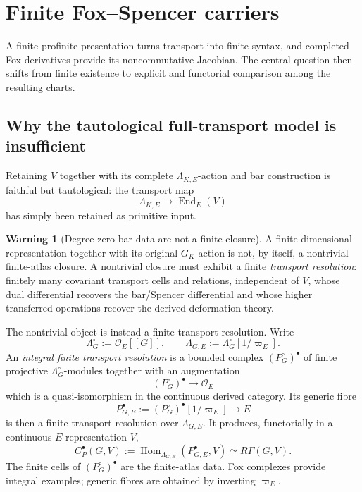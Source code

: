 \documentclass[11pt]{article}
\theoremstyle{definition}
\newtheorem{warning}[theorem]{Warning}
\newcommand{\End}{\operatorname{End}}
\begin{document}
\section{Finite Fox--Spencer carriers}\label{sec:fox-spencer}

A finite profinite presentation turns transport into finite syntax, and completed Fox derivatives provide its noncommutative Jacobian.  The central question then shifts from finite existence to explicit and functorial comparison among the resulting charts.

\subsection{Why the tautological full-transport model is insufficient}

Retaining $V$ together with its complete $\Lambda_{K,E}$-action and bar construction is faithful but tautological: the transport map
\[
\Lambda_{K,E}\longrightarrow \End_E(V)
\]
has simply been retained as primitive input.

\begin{warning}[Degree-zero bar data are not a finite closure]\label{warn:no-degreezero-tautology}
A finite-dimensional representation together with its original $G_K$-action is not, by itself, a nontrivial finite-atlas closure.  A nontrivial closure must exhibit a finite \emph{transport resolution}: finitely many covariant transport cells and relations, independent of $V$, whose dual differential recovers the bar/Spencer differential and whose higher transferred operations recover the derived deformation theory.
\end{warning}

The nontrivial object is instead a finite transport resolution.  Write
\[
\Lambda_G^\circ:=\mathcal O_E[[G]],
\qquad
\Lambda_{G,E}:=\Lambda_G^\circ[1/\varpi_E].
\]
An \emph{integral finite transport resolution} is a bounded complex $(P_G^\circ)^\bullet$ of finite projective $\Lambda_G^\circ$-modules together with an augmentation
\[
(P_G^\circ)^\bullet\longrightarrow \mathcal O_E
\]
which is a quasi-isomorphism in the continuous derived category.  Its generic fibre
\[
P_{G,E}^\bullet:=(P_G^\circ)^\bullet[1/\varpi_E]
\longrightarrow E
\]
is then a finite transport resolution over $\Lambda_{G,E}$.  It produces, functorially in a continuous $E$-representation $V$,
\[
C_{P}^\bullet(G,V):=\operatorname{Hom}_{\Lambda_{G,E}}(P_{G,E}^\bullet,V)
\simeq R\Gamma(G,V).
\]
The finite cells of $(P_G^\circ)^\bullet$ are the finite-atlas data.  Fox complexes provide integral examples; generic fibres are obtained by inverting $\varpi_E$.
\end{document}
